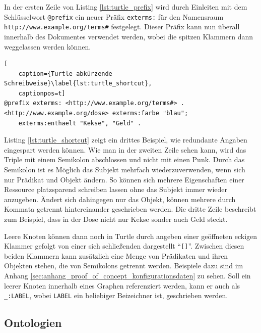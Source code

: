 In der ersten Zeile von Listing \ref{lst:turtle_prefix} wird durch Einleiten mit dem Schlüsselwort \texttt{@prefix} ein neuer Präfix \texttt{exterms:} für den Namensraum \texttt{http://www.example.org/terms\#} festgelegt. Dieser Präfix kann nun überall innerhalb des Dokumentes verwendet werden, wobei die spitzen Klammern dann weggelassen werden können.

\begin{lstlisting}[
    caption={Turtle abkürzende Schreibweise}\label{lst:turtle_shortcut},
    captionpos=t]
@prefix exterms: <http://www.example.org/terms#> .
<http://www.example.org/dose> exterms:farbe "blau";
    exterms:enthaelt "Kekse", "Geld" .   
\end{lstlisting}

Listing \ref{lst:turtle_shortcut} zeigt ein drittes Beispiel, wie redundante Angaben eingespart werden können. Wie man in der zweiten Zeile sehen kann, wird das Triple mit einem Semikolon abschlossen und nicht mit einen Punk. Durch das Semikolon ist es Möglich das Subjekt mehrfach wiederzuverwenden, wenn sich nur Prädikat und Objekt ändern. So können sich mehrere Eigenschaften einer Ressource platzsparend schreiben lassen ohne das Subjekt immer wieder anzugeben. Ändert sich dahingegen nur das Objekt, können mehrere durch Kommata getrennt hintereinander geschrieben werden. Die dritte Zeile beschreibt zum Beispiel, dass in der Dose nicht nur Kekse sonder auch Geld steckt. 

Leere Knoten können dann noch in Turtle durch angeben einer geöffneten eckigen Klammer gefolgt von einer sich schließenden dargestellt \enquote{\texttt{[]}}. Zwischen diesen beiden Klammern kann zusätzlich eine Menge von Prädikaten und ihren Objekten stehen, die von Semikolons getrennt werden. Beispiele dazu sind im Anhang \ref{sec:anhang_proof_of_concept_konfigurationsdaten} zu sehen. Soll ein leerer Knoten innerhalb eines Graphen referenziert werden, kann er auch als \texttt{\_:LABEL}, wobei \texttt{LABEL} ein beliebiger Beizeichner ist, geschrieben werden.




\subsection{Ontologien} %
\label{sub:ontologien}


